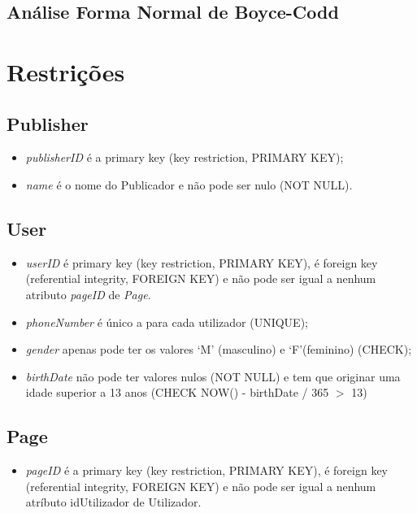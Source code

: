 \documentclass[12pt]{report}
\begin{document}
\section{Análise Forma Normal de Boyce-Codd}

\chapter{Restrições}

\section{Publisher}

\begin{itemize}
    \item \textit{publisherID} é a primary key (key restriction, PRIMARY KEY);
    \item \textit{name} é o nome do Publicador e não pode ser nulo (NOT NULL).
\end{itemize}

\section{User}

\begin{itemize}
    \item \textit{userID} é primary key (key restriction, PRIMARY KEY), é foreign key (referential integrity, FOREIGN KEY) e não pode ser igual a nenhum atributo \textit{pageID} de \textit{Page}.
    \item \textit{phoneNumber} é único a para cada utilizador (UNIQUE);
    \item \textit{gender} apenas pode ter os valores ‘M’ (masculino) e ‘F’(feminino) (CHECK);
    \item \textit{birthDate} não pode ter valores nulos (NOT NULL) e tem que originar uma idade superior a 13 anos (CHECK NOW() - birthDate / 365 $>$ 13)
\end{itemize}

\section{Page}

\begin{itemize}
    \item \textit{pageID} é a primary key (key restriction, PRIMARY KEY), é foreign key (referential integrity, FOREIGN KEY) e não pode ser igual a nenhum atríbuto idUtilizador de Utilizador.
\end{itemize}
\end{document}

